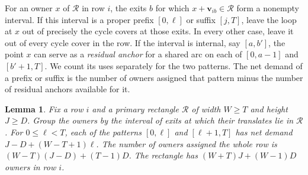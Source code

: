 \documentclass[10pt]{article}
\numberwithin{equation}{section}
\newtheorem{lemma}[lemma]{Lemma}
\theoremstyle{definition}
\begin{document}
For an owner $x$ of $\mathcal R$ in row $i$, the exits $b$ for which $x+\mathbf v_{ib}\in\mathcal R$ form a nonempty interval. If this interval is a proper prefix $[0,\ell]$ or suffix $[j,T]$, leave the loop at $x$ out of precisely the cycle covers at those exits. In every other case, leave it out of every cycle cover in the row. If the interval is internal, say $[a,b']$, the point $x$ can serve as a \emph{residual anchor} for a shared arc on each of $[0,a-1]$ and $[b'+1,T]$. We count its uses separately for the two patterns. The net demand of a prefix or suffix is the number of owners assigned that pattern minus the number of residual anchors available for it.

\begin{lemma}\label{lem:rectangle-owners}
Fix a row $i$ and a primary rectangle $\mathcal R$ of width $W\ge T$ and height $J\ge D$. Group the owners by the interval of exits at which their translates lie in $\mathcal R$. For $0\le\ell<T$, each of the patterns $[0,\ell]$ and $[\ell+1,T]$ has net demand $J-D+(W-T+1)\ell$. The number of owners assigned the whole row is $(W-T)(J-D)+(T-1)D$. The rectangle has $(W+T)J+(W-1)D$ owners in row $i$.
\end{lemma}
\end{document}
